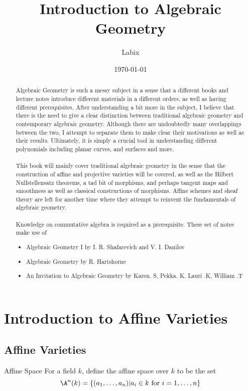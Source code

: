 \documentclass[a4paper]{article}
\title{Introduction to Algebraic Geometry}
\author{Labix}
\date{\today}
\begin{document}
\maketitle
\begin{abstract}
Algebraic Geometry is such a messy subject in a sense that a different books and lecture notes introduce different materials in a different orders, as well as having different prerequisites. After understanding a bit more in the subject, I believe that there is the need to give a clear distinction between traditional algebraic geometry and contemporary algebraic geometry. Although there are undoubtedly many overlappings between the two, I attempt to separate them to make clear their motivations as well as their results. Ultimately, it is simply a crucial tool in understanding different polynomials including planar curves, and surfaces and more. \\~\\

This book will mainly cover traditional algebraic geometry in the sense that the construction of affine and projective varieties will be covered, as well as the Hilbert Nullstellensatz theorems, a tad bit of morphisms, and perhaps tangent maps and smoothness as well as classical constructions of morphisms. Affine schemes and sheaf theory are left for another time where they attempt to reinvent the fundamentals of algebraic geometry. \\~\\

Knowledge on commutative algebra is required as a prerequisite. These set of notes make use of
\begin{itemize}
\item Algebraic Geometry I by I. R. Shafarevich and V. I. Danilov
\item Algebraic Geometry by R. Hartshorne
\item An Invitation to Algebraic Geometry by Karen. S, Pekka. K, Lauri .K, William .T
\end{itemize}
\end{abstract}
\pagebreak
\tableofcontents
\pagebreak

\section{Introduction to Affine Varieties}
\subsection{Affine Varieties}
\begin{defn}{Affine Space}{} For a field $k$, define the affine space over $k$ to be the set $$\A^n(k)=\{(a_1,\dots,a_n)|a_i\in k\text{ for }i=1,\dots,n\}$$
\end{defn}
\end{document}

